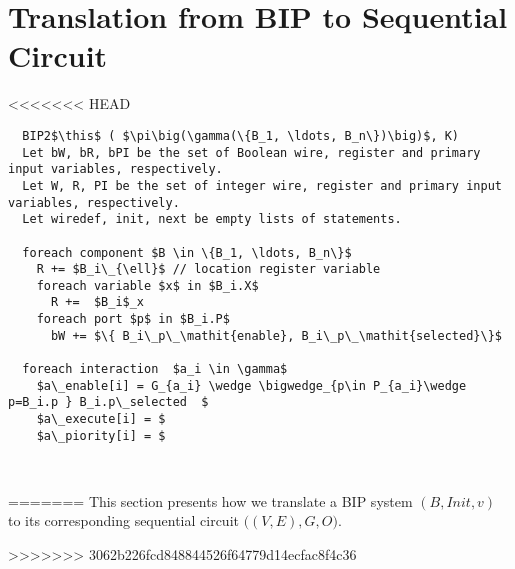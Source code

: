 \section{Translation from BIP to Sequential Circuit}
\label{sect-translation}
<<<<<<< HEAD

\begin{lstlisting}
  BIP2$\this$ ( $\pi\big(\gamma(\{B_1, \ldots, B_n\})\big)$, K)
  Let bW, bR, bPI be the set of Boolean wire, register and primary input variables, respectively.
  Let W, R, PI be the set of integer wire, register and primary input variables, respectively.
  Let wiredef, init, next be empty lists of statements. 

  foreach component $B \in \{B_1, \ldots, B_n\}$
    R += $B_i\_{\ell}$ // location register variable
    foreach variable $x$ in $B_i.X$
      R +=  $B_i$_x
    foreach port $p$ in $B_i.P$ 
      bW += $\{ B_i\_p\_\mathit{enable}, B_i\_p\_\mathit{selected}\}$

  foreach interaction  $a_i \in \gamma$
    $a\_enable[i] = G_{a_i} \wedge \bigwedge_{p\in P_{a_i}\wedge p=B_i.p } B_i.p\_selected  $ 
    $a\_execute[i] = $
    $a\_piority[i] = $

      

\end{lstlisting}
=======
This section presents how we translate a BIP system $(B,\mathit{Init}, v)$ to its corresponding sequential circuit  $\big( (V, E),G, O\big)$. 

>>>>>>> 3062b226fcd848844526f64779d14ecfac8f4c36

